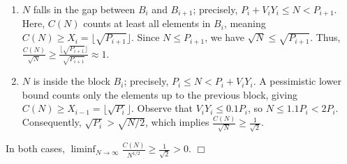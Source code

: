 \begin{enumerate}
    \item $N$ falls in the gap between $B_i$ and $B_{i + 1}$; precisely, $P_i + V_iY_i \leq N < P_{i + 1}$. Here, $C(N)$ counts at least all elements in $B_i$, meaning $C(N) \geq X_i = \lfloor \sqrt{P_{i + 1}} \rfloor$. Since $N \leq P_{i + 1}$, we have $\sqrt{N} \leq \sqrt{P_{i + 1}}$. Thus, $\frac{C(N)}{\sqrt{N}} \geq \frac{\lfloor \sqrt{P_{i + 1}} \rfloor}{\sqrt{P_{i + 1}}} \approx 1$.
    \item $N$ is inside the block $B_i$; precisely, $P_i \leq N < P_i + V_iY_i$. A pessimistic lower bound counts only the elements up to the previous block, giving $C(N) \geq X_{i - 1} = \lfloor \sqrt{P_i} \rfloor$. Observe that $V_iY_i \leq 0.1P_i$, so $N \leq 1.1 P_i < 2 P_i$. Consequently, $\sqrt{P_i} > \sqrt{N/2}$, which implies $\frac{C(N)}{\sqrt{N}} \geq \frac{1}{\sqrt{2}}$.
\end{enumerate}
In both cases, $\liminf_{N \to \infty} \frac{C(N)}{N^{1/2}} \ge \frac{1}{\sqrt{2}} > 0$. \hfill $\Box$
